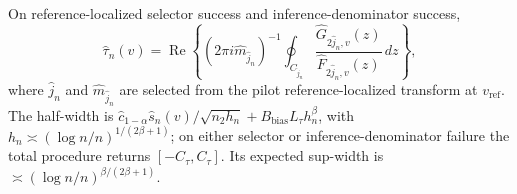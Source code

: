 On reference-localized selector success and inference-denominator success,
\[
 \widehat\tau_n(v)=\operatorname{Re}\left\{
 (2\pi i\widehat m_{\widehat j_n})^{-1}
 \oint_{C_{\widehat j_n}}
 \frac{\widehat G_{2\widehat j_n,v}(z)}
 {\widehat F_{2\widehat j_n,v}(z)}\,dz\right\},
\]
where \(\widehat j_n\) and \(\widehat m_{\widehat j_n}\) are selected from the pilot reference-localized transform at \(v_{\mathrm{ref}}\).  The half-width is \(\widehat c_{1-\alpha}\widehat s_n(v)/\sqrt{n_2h_n}+B_{\mathrm{bias}}L_\tau h_n^\beta\), with \(h_n\asymp(\log n/n)^{1/(2\beta+1)}\); on either selector or inference-denominator failure the total procedure returns \([-C_\tau,C_\tau]\).  Its expected sup-width is \(\asymp(\log n/n)^{\beta/(2\beta+1)}\).